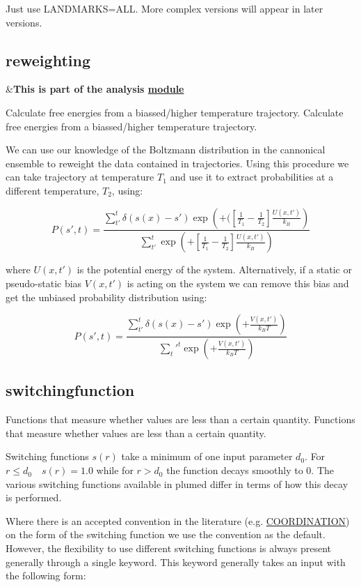 Just use L\+A\+N\+D\+M\+A\+R\+K\+S=A\+L\+L. More complex versions will appear in later versions. \hypertarget{reweighting}{}\subsection{reweighting}\label{reweighting}
\begin{TabularC}{2}
\hline
&{\bfseries  This is part of the analysis \hyperlink{mymodules}{module }}   \\
\end{TabularC}
Calculate free energies from a biassed/higher temperature trajectory. Calculate free energies from a biassed/higher temperature trajectory.  

We can use our knowledge of the Boltzmann distribution in the cannonical ensemble to reweight the data contained in trajectories. Using this procedure we can take trajectory at temperature $T_1$ and use it to extract probabilities at a different temperature, $T_2$, using\+:

\[ P(s',t) = \frac{ \sum_{t'}^t \delta( s(x) - s' ) \exp\left( +( \left[\frac{1}{T_1} - \frac{1}{T_2}\right] \frac{U(x,t')}{k_B} \right) }{ \sum_{t'}^t \exp\left( +\left[\frac{1}{T_1} - \frac{1}{T_2}\right] \frac{U(x,t')}{k_B} \right) } \]

where $U(x,t')$ is the potential energy of the system. Alternatively, if a static or pseudo-\/static bias $V(x,t')$ is acting on the system we can remove this bias and get the unbiased probability distribution using\+:

\[ P(s',t) = \frac{ \sum_{t'}^t \delta( s(x) - s' ) \exp\left( +\frac{V(x,t')}{k_B T} \right) }{ \sum_t'^t \exp\left( +\frac{V(x,t')}{k_B T} \right) } \] \hypertarget{switchingfunction}{}\subsection{switchingfunction}\label{switchingfunction}
Functions that measure whether values are less than a certain quantity. Functions that measure whether values are less than a certain quantity. 

Switching functions $s(r)$ take a minimum of one input parameter $d_0$. For $r \le d_0 \quad s(r)=1.0$ while for $r > d_0$ the function decays smoothly to 0. The various switching functions available in plumed differ in terms of how this decay is performed.

Where there is an accepted convention in the literature (e.\+g. \hyperlink{COORDINATION}{C\+O\+O\+R\+D\+I\+N\+A\+T\+I\+O\+N}) on the form of the switching function we use the convention as the default. However, the flexibility to use different switching functions is always present generally through a single keyword. This keyword generally takes an input with the following form\+:

